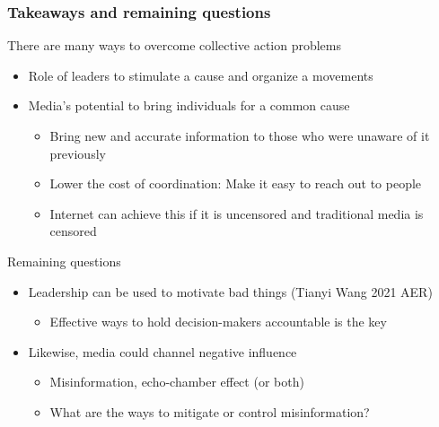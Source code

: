 \documentclass[aspectratio=169]{beamer}
\begin{document}
\begin{frame}
\frametitle{Takeaways and remaining questions} 
There are many ways to overcome collective action problems
\begin{itemize}\setlength\itemsep{3pt}
\item Role of leaders to stimulate a cause and organize a movements
\item Media's potential to bring individuals for a common cause
\begin{itemize}\setlength\itemsep{3pt}
\item Bring new and accurate information to those who were unaware of it previously
\item Lower the cost of coordination: Make it easy to reach out to people
\item Internet can achieve this if it is uncensored and traditional media is censored
\end{itemize}
\end{itemize}\medskip
Remaining questions
\begin{itemize}\setlength\itemsep{3pt}
\item Leadership can be used to motivate bad things (Tianyi Wang 2021 AER)
\begin{itemize}\setlength\itemsep{3pt}
\item Effective ways to hold decision-makers accountable is the key 
\end{itemize}
\item Likewise, media could channel negative influence
\begin{itemize}\setlength\itemsep{3pt}
\item Misinformation, echo-chamber effect (or both)
\item What are the ways to mitigate or control misinformation?
\end{itemize}
\end{itemize}
\end{frame}


\end{document}
